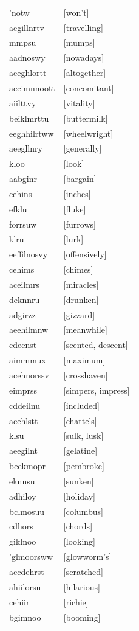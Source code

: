 \documentclass{article}
\begin{document}
\begin{tabular}{ll}
'notw & [won't] \\
aegillnrtv & [travelling] \\
mmpsu & [mumps] \\
aadnoswy & [nowadays] \\
aeeghlortt & [altogether] \\
accimnnoott & [concomitant] \\
aiilttvy & [vitality] \\
beiklmrttu & [buttermilk] \\
eeghhilrtww & [wheelwright] \\
aeegllnry & [generally] \\
kloo & [look] \\
aabginr & [bargain] \\
cehins & [inches] \\
efklu & [fluke] \\
forrsuw & [furrows] \\
klru & [lurk] \\
eeffilnosvy & [offensively] \\
cehims & [chimes] \\
aceilmrs & [miracles] \\
deknnru & [drunken] \\
adgirzz & [gizzard] \\
aeehilmnw & [meanwhile] \\
cdeenst & [scented, descent] \\
aimmmux & [maximum] \\
acehnorssv & [crosshaven] \\
eimprss & [simpers, impress] \\
cddeilnu & [included] \\
acehlstt & [chattels] \\
klsu & [sulk, lusk] \\
aeegilnt & [gelatine] \\
beekmopr & [pembroke] \\
eknnsu & [sunken] \\
adhiloy & [holiday] \\
bclmosuu & [columbus] \\
cdhors & [chords] \\
giklnoo & [looking] \\
'glmoorsww & [glowworm's] \\
accdehrst & [scratched] \\
ahiilorsu & [hilarious] \\
cehiir & [richie] \\
bgimnoo & [booming] \\

\end{tabular}
\end{document}
